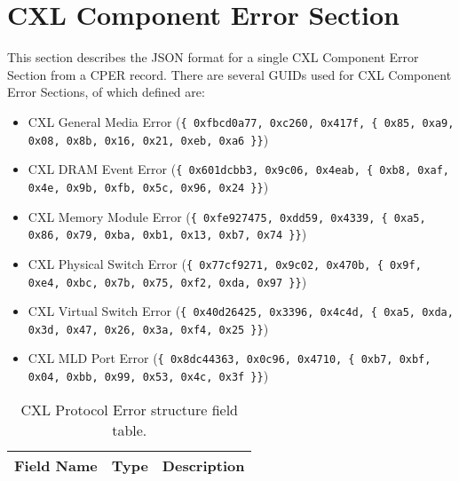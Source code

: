 \documentclass{report}
\newcommand*{\thead}[1]{\multicolumn{1}{|c|}{\bfseries #1}}
\newcommand*{\jsontable}[1]{
    \begin{table}[!ht]
    \label{#1}
    \centering
    \begin{adjustbox}{center}
    \begin{tabular}{|l|c|p{8cm}|}
    \hline
    \thead{Field Name} & \thead{Type} & \thead{Description} \\
    \hline
}
\newcommand*{\jsontableend}[1]{
    \hline
    \end{tabular}
    \end{adjustbox}
    \caption{#1}
    \label{table:#1}
    \end{table}
    \FloatBarrier
}
\begin{document}
\section{CXL Component Error Section}
\label{section:cxlcomponenterrorsection}
This section describes the JSON format for a single CXL Component Error Section from a CPER record. There are several GUIDs used for CXL Component Error Sections, of which defined are:\\
\begin{itemize}
    \item CXL General Media Error (\texttt{\{ 0xfbcd0a77, 0xc260, 0x417f, \{ 0x85, 0xa9, 0x08, 0x8b, 0x16, 0x21, 0xeb, 0xa6 \}\}})\\
    \item CXL DRAM Event Error (\texttt{\{ 0x601dcbb3, 0x9c06, 0x4eab, \{ 0xb8, 0xaf, 0x4e, 0x9b, 0xfb, 0x5c, 0x96, 0x24 \}\}})\\
    \item CXL Memory Module Error (\texttt{\{ 0xfe927475, 0xdd59, 0x4339, \{ 0xa5, 0x86, 0x79, 0xba, 0xb1, 0x13, 0xb7, 0x74 \}\}})\\
    \item CXL Physical Switch Error (\texttt{\{ 0x77cf9271, 0x9c02, 0x470b, \{ 0x9f, 0xe4, 0xbc, 0x7b, 0x75, 0xf2, 0xda, 0x97 \}\}})\\
    \item CXL Virtual Switch Error (\texttt{\{ 0x40d26425, 0x3396, 0x4c4d, \{ 0xa5, 0xda, 0x3d, 0x47, 0x26, 0x3a, 0xf4, 0x25 \}\}})\\
    \item CXL MLD Port Error (\texttt{\{ 0x8dc44363, 0x0c96, 0x4710, \{ 0xb7, 0xbf, 0x04, 0xbb, 0x99, 0x53, 0x4c, 0x3f \}\}})\\
\end{itemize}
\jsontable{table:cxlcomponenterrorsection}

\jsontableend{CXL Protocol Error structure field table.}
\end{document}
